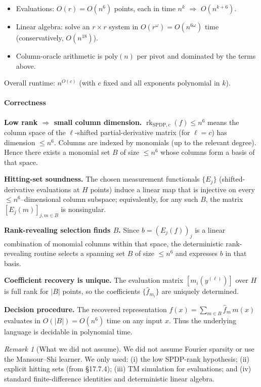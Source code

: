 \documentclass[12pt]{article}
\theoremstyle{definition}
\theoremstyle{definition}
\theoremstyle{remark}
\newtheorem{remark}{Remark}
\theoremstyle{remark}
\begin{document}
\begin{itemize}
\item Evaluations: $O(r) = O(n^6)$ points, each in time $n^k$ $\Rightarrow$ $O(n^{k+6})$.
\item Linear algebra: solve an $r \times r$ system in $O(r^\omega) = O(n^{6\omega})$ time (conservatively, $O(n^{18})$).
\item Column-oracle arithmetic is $\mathrm{poly}(n)$ per pivot and dominated by the terms above.
\end{itemize}

Overall runtime: $n^{O(c)}$ (with $c$ fixed and all exponents polynomial in $k$).

\paragraph{Correctness}

\textbf{Low rank $\Rightarrow$ small column dimension.}
$\operatorname{rk}_{\mathrm{SPDP},c}(f) \le n^6$ means the column space of the $\ell$-shifted partial-derivative matrix (for $\ell = c$) has dimension $\le n^6$. Columns are indexed by monomials (up to the relevant degree). Hence there exists a monomial set $B$ of size $\le n^6$ whose columns form a basis of that space.

\textbf{Hitting-set soundness.}
The chosen measurement functionals $\{E_j\}$ (shifted-derivative evaluations at $H$ points) induce a linear map that is injective on every $\le n^6$--dimensional column subspace; equivalently, for any such $B$, the matrix $[E_j(m)]_{j, m \in B}$ is nonsingular.

\textbf{Rank-revealing selection finds $B$.}
Since $b = (E_j(f))_j$ is a linear combination of monomial columns within that space, the deterministic rank-revealing routine selects a spanning set $B$ of size $\le n^6$ and expresses $b$ in that basis.

\textbf{Coefficient recovery is unique.}
The evaluation matrix $[m_i(y^{(\ell)})]$ over $H$ is full rank for $|B|$ points, so the coefficients $\{\hat{f}_{m_i}\}$ are uniquely determined.

\textbf{Decision procedure.}
The recovered representation $f(x) = \sum_{m \in B} \hat{f}_m\, m(x)$ evaluates in $O(|B|) = O(n^6)$ time on any input $x$. Thus the underlying language is decidable in polynomial time.

\begin{remark}[What we did not assume]
We did not assume Fourier sparsity or use the Mansour--Shi learner. We only used: (i) the low SPDP-rank hypothesis; (ii) explicit hitting sets (from \S17.7.4); (iii) TM simulation for evaluations; and (iv) standard finite-difference identities and deterministic linear algebra.
\end{remark}
\end{document}
